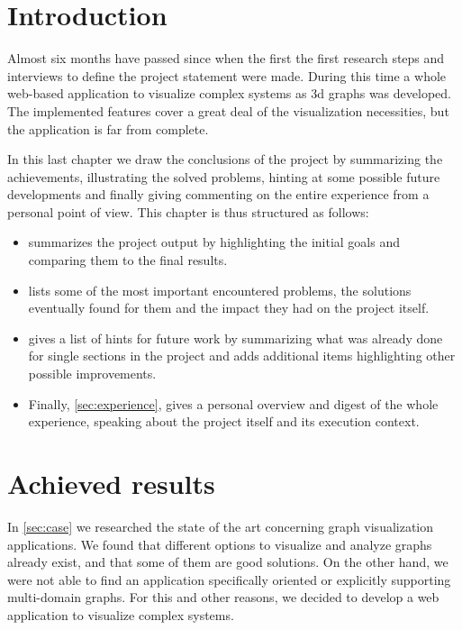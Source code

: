 
\section{Introduction}

Almost six months have passed since when the first the first research steps and interviews to define the project statement were made. During this time a whole web-based application to visualize complex systems as \gls{3d} graphs was developed. The implemented features cover a great deal of the visualization necessities, but the application is far from complete.

In this last chapter we draw the conclusions of the project by summarizing the achievements, illustrating the solved problems, hinting at some possible future developments and finally giving commenting on the entire experience from a personal point of view. This chapter is thus structured as follows:

\begin{itemize}
	\item {} summarizes the project output by highlighting the initial goals and comparing them to the final results.
	\item {} lists some of the most important encountered problems, the solutions eventually found for them and the impact they had on the project itself.
	\item {} gives a list of hints for future work by summarizing what was already done for single sections in the project and adds additional items highlighting other possible improvements.
	\item Finally, \ref*{sec:experience}, gives a personal overview and digest of the whole experience, speaking about the project itself and its execution context.
\end{itemize}

\section{Achieved results}
\label{sec:results}

In \vref{sec:case} we researched the state of the art concerning graph visualization applications. We found that different options to visualize and analyze graphs already exist, and that some of them are good solutions. On the other hand, we were not able to find an application specifically oriented or explicitly supporting multi-domain graphs. For this and other reasons, we decided to develop a web application to visualize complex systems.

